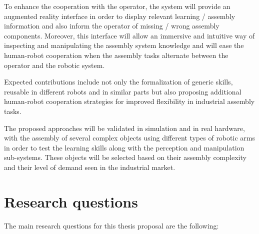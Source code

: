 To enhance the cooperation with the operator, the system will provide an augmented reality interface in order to display relevant learning / assembly information and also inform the operator of missing / wrong assembly components. Moreover, this interface will allow an immersive and intuitive way of inspecting and manipulating the assembly system knowledge and will ease the human-robot cooperation when the assembly tasks alternate between the operator and the robotic system.

Expected contributions include not only the formalization of generic skills, reusable in different robots and in similar parts but also proposing additional human-robot cooperation strategies for improved flexibility in industrial assembly tasks.

The proposed approaches will be validated in simulation and in real hardware, with the assembly of several complex objects using different types of robotic arms in order to test the learning skills along with the perception and manipulation sub-systems. These objects will be selected based on their assembly complexity and their level of demand seen in the industrial market.



\section{Research questions}

The main research questions for this thesis proposal are the following:

